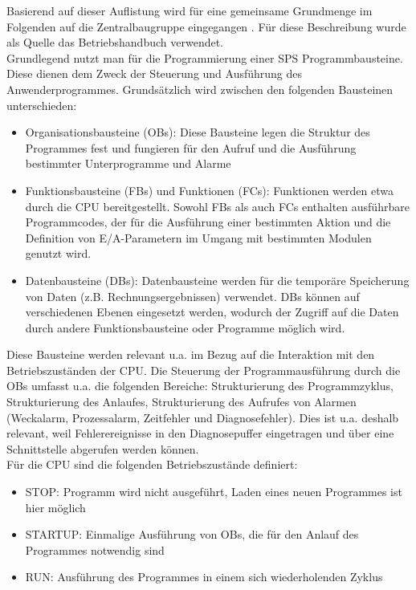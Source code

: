 Basierend auf dieser Auflistung wird für eine gemeinsame Grundmenge im Folgenden auf die Zentralbaugruppe eingegangen \citep{SiemensSPS1}. Für diese Beschreibung wurde als Quelle das Betriebshandbuch \citep{SiemensSPS2} verwendet. \\

Grundlegend nutzt man für die Programmierung einer SPS Programmbausteine. Diese dienen dem Zweck der Steuerung und Ausführung des Anwenderprogrammes. Grundsätzlich wird zwischen den folgenden Bausteinen unterschieden:
\begin{itemize}
\item Organisationsbausteine (OBs): Diese Bausteine legen die Struktur des Programmes fest und fungieren für den Aufruf und die Ausführung bestimmter Unterprogramme und Alarme
\item Funktionsbausteine (FBs) und Funktionen (FCs): Funktionen werden etwa durch die CPU bereitgestellt. Sowohl FBs als auch FCs enthalten ausführbare Programmcodes, der für die Ausführung einer bestimmten Aktion und die Definition von E/A-Parametern im Umgang mit bestimmten Modulen genutzt wird. 
\item Datenbausteine (DBs): Datenbausteine werden für die temporäre Speicherung von Daten (z.B. Rechnungsergebnissen) verwendet. DBs können auf verschiedenen Ebenen eingesetzt werden, wodurch der Zugriff auf die Daten durch andere Funktionsbausteine oder Programme möglich wird.
\end{itemize}

Diese Bausteine werden relevant u.a. im Bezug auf die Interaktion mit den Betriebszuständen der CPU. Die Steuerung der Programmausführung durch die OBs umfasst u.a. die folgenden Bereiche: Strukturierung des Programmzyklus, Strukturierung des Anlaufes, Strukturierung des Aufrufes von Alarmen (Weckalarm, Prozessalarm, Zeitfehler und Diagnosefehler). Dies ist u.a. deshalb relevant, weil Fehlerereignisse in den Diagnosepuffer eingetragen und über eine Schnittstelle abgerufen werden können. \\

Für die CPU sind die folgenden Betriebszustände definiert:  
\begin{itemize}
\item STOP: Programm wird nicht ausgeführt, Laden eines neuen Programmes ist hier möglich
\item STARTUP: Einmalige Ausführung von OBs, die für den Anlauf des Programmes notwendig sind
\item RUN: Ausführung des Programmes in einem sich wiederholenden Zyklus
\end{itemize}

